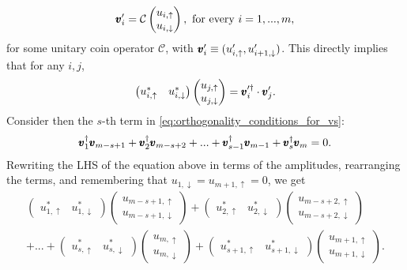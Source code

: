 \begin{equation*}
	\pmb{v}_i^\prime
	= \mathcal C
	\begin{pmatrix}
		u_{i,\uparrow} \\ u_{i, \downarrow}
	\end{pmatrix},
	\text{ for every }
	i = 1, ..., m,
\end{equation*}
for some unitary coin operator $\mathcal C$,
with $\pmb{v}'_i \equiv (u_{i,\uparrow}',u_{i+1,\downarrow}')$.
This directly implies that for any $i, j$,
\begin{equation}
	\begin{pmatrix}
		u_{i, \uparrow}^* & u_{i, \downarrow}^*
	\end{pmatrix}
	\begin{pmatrix}
		u_{j, \uparrow} \\ u_{j, \downarrow}
	\end{pmatrix}
	=
	\pmb{v}^{\prime\dagger}_{i} \cdot \pmb{v}^\prime_j.
	\label{eq:transition_us_to_vprimes}
\end{equation}
Consider then the $s$-th term in \cref{eq:orthogonality_conditions_for_vs}:
\begin{equation*}
	\pmb{v}_1^\dagger \pmb{v}_{m-s+1}
	+ \pmb{v}_2^\dagger \pmb{v}_{m-s+2}
	+ ...
	+ \pmb{v}_{s-1}^\dagger \pmb{v}_{m-1}
	+ \pmb{v}_s^\dagger \pmb{v}_m = 0.
\end{equation*}
Rewriting the LHS of the equation above in terms of the amplitudes, rearranging the terms, and remembering that $u_{1, \downarrow} = u_{m+1, \uparrow} = 0$, we get
{\footnotesize\begin{equation*}
\begin{aligned}
	\begin{pmatrix}
		u_{1, \uparrow}^* & u_{1, \downarrow}^*
	\end{pmatrix}
	\begin{pmatrix}
		u_{m-s+1, \uparrow} \\ u_{m-s+1, \downarrow}
	\end{pmatrix}
	+
	\begin{pmatrix}
		u_{2, \uparrow}^* & u_{2, \downarrow}^*
	\end{pmatrix}
	\begin{pmatrix}
		u_{m-s+2, \uparrow} \\ u_{m-s+2, \downarrow}
	\end{pmatrix} \\
	+ ... + 
	\begin{pmatrix}
		u_{s, \uparrow}^* & u_{s, \downarrow}^*
	\end{pmatrix}
	\begin{pmatrix}
		u_{m, \uparrow} \\ u_{m, \downarrow}
	\end{pmatrix}
	+
	\begin{pmatrix}
		u_{s+1, \uparrow}^* & u_{s+1, \downarrow}^*
	\end{pmatrix}
	\begin{pmatrix}
		u_{m+1, \uparrow} \\ u_{m+1, \downarrow}
	\end{pmatrix}.
\end{aligned}
\end{equation*}}

